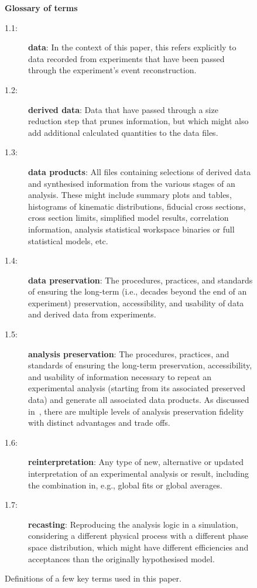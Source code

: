 \documentclass[11pt]{article}
\begin{document}
\begin{figure}[!ht]
\begin{tcolorbox}
\begin{center}
{\large \textbf{Glossary of terms}}
\end{center}
%
\begin{description}
    \item[1.1:] \textbf{\Gls{data}}: In the context of this paper, this refers explicitly to data recorded from experiments that have been passed through the experiment's event reconstruction.
    \item[1.2:] \textbf{\Gls{derived data}}: Data that have passed through a size reduction step that prunes information, but which might also add additional calculated quantities to the data files.
    \item[1.3:] \textbf{\Glspl{data product}}: All files containing selections of derived data and synthesised information from the various stages of an analysis.
These might include summary plots and tables, histograms of kinematic distributions, fiducial cross sections, cross section limits, simplified model results, correlation information, analysis statistical workspace binaries or full statistical models, etc.~\cite{Cranmer:2021urp}
    \item[1.4:] \textbf{\Gls{data preservation}}: The procedures, practices, and standards of ensuring the long-term (i.e., decades beyond the end of an experiment) preservation, accessibility, and usability of data and derived data from experiments.
    \item[1.5:] \textbf{\Gls{analysis preservation}}: The procedures, practices, and standards of ensuring the long-term preservation, accessibility, and usability of information necessary to repeat an experimental analysis (starting from its associated preserved data) and generate all associated \glspl{data product}.
    As discussed in~, there are multiple levels of analysis preservation fidelity with distinct advantages and trade offs.
    \item[1.6:] \textbf{\Gls{reinterpretation}}: Any type of new, alternative or updated interpretation of an experimental analysis or result, including the combination in, e.g., global fits or global averages. 
    \item[1.7:] \textbf{\Gls{recasting}}: Reproducing the analysis logic in a simulation, considering a different physical process with a different phase space distribution, which might have different efficiencies and acceptances than the originally hypothesised model.
\end{description}
\end{tcolorbox}
\caption{Definitions of a few key terms used in this paper.}
\label{fig:glossary}
\end{figure}
\end{document}
